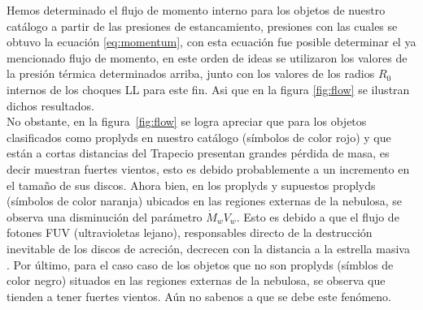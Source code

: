 Hemos determinado el flujo de momento interno para los objetos de nuestro catálogo a partir de las presiones de estancamiento, presiones con las cuales se obtuvo la ecuación \ref{eq:momentum}, con esta ecuación fue posible determinar el ya mencionado flujo de momento, en este orden de ideas se utilizaron los valores de la presión térmica determinados arriba, junto con los valores de los radios \(R_{0}\) internos de los choques LL para este fin. Asi que en la figura \ref{fig:flow} se ilustran dichos resultados.\\

No obstante, en la figura~\ref{fig:flow} se logra apreciar que para los objetos clasificados como proplyds en nuestro catálogo (símbolos de color rojo) y que están a cortas distancias del Trapecio presentan grandes pérdida de masa, es decir  muestran fuertes vientos, esto es debido probablemente a un incremento en el tamaño de sus discos. Ahora bien, en los proplyds y supuestos proplyds (símbolos de color naranja) ubicados en las regiones externas de la nebulosa, se observa una disminución del parámetro \(\dot{M}_{w}V_{w}\). Esto es debido a que el flujo de fotones FUV (ultravioletas lejano), responsables directo de la destrucción inevitable de los discos de acreción, decrecen con la distancia a la estrella masiva \thC{}. Por último, para el caso caso de los objetos que no son proplyds (símblos de color negro) situados en las regiones externas de la nebulosa, se observa que tienden a tener fuertes vientos. Aún no sabenos a que se debe este fenómeno.\\ 


%

%
